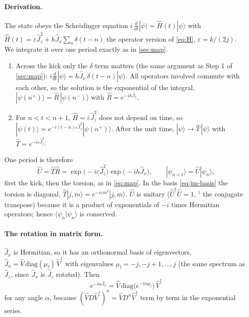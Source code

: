 \documentclass[11pt,a4paper]{article}
\begin{document}
\paragraph{Derivation.} The state obeys the Schrödinger equation $i\,\frac{d}{dt}|\psi\rangle = \hat H(t)|\psi\rangle$
with $\hat H(t) = \varepsilon\hat J_z^2 + h\hat J_x\sum_n\delta(t-n)$ the operator version of \eqref{eq:H}, $\varepsilon = k/(2j)$. We integrate it over one period exactly as in \cref{sec:map}.
\begin{enumerate}
  \item Across the kick only the $\delta$ term matters (the same argument as Step 1 of \cref{sec:map}):
  $i\frac{d}{dt}|\psi\rangle = h\hat J_x\,\delta(t-n)|\psi\rangle$. All operators involved commute
  with each other, so the solution is the exponential of the integral,
  $|\psi(n^+)\rangle = \hat R\,|\psi(n^-)\rangle$ with $\hat R = e^{-ih\hat J_x}$.
  \item For $n < t < n+1$, $\hat H = \varepsilon\hat J_z^2$ does not depend on time, so $|\psi(t)\rangle =
  e^{-i(t-n)\varepsilon\hat J_z^2}|\psi(n^+)\rangle$. After the unit time, $|\psi\rangle \to \hat T\,|\psi\rangle$
  with $\hat T = e^{-i\varepsilon\hat J_z^2}$.
\end{enumerate}
One period is therefore
\begin{equation}\label{eq:floquet}
  \boxed{\hat U = \hat T\hat R = \exp\!\big(-i\varepsilon\hat J_z^2\big)\exp\!\big(-ih\hat J_x\big), \qquad
  |\psi_{n+1}\rangle = \hat U|\psi_n\rangle ,}
\end{equation}
first the kick, then the torsion, as in \eqref{eq:map}. In the basis \eqref{eq:jm-basis} the torsion is diagonal,
$\hat T|j,m\rangle = e^{-i\varepsilon m^2}|j,m\rangle$. $\hat U$ is unitary ($\hat U^\dagger\hat U = 1$, $^\dagger$ the conjugate
transpose) because it is a product of exponentials of $-i$ times Hermitian operators; hence $\langle\psi_n|\psi_n\rangle$
is conserved.

\paragraph{The rotation in matrix form.} $\hat J_x$ is Hermitian, so it has an orthonormal basis of eigenvectors,
$\hat J_x = \hat V\,\mathrm{diag}(\mu_l)\,\hat V^\dagger$ with eigenvalues $\mu_l = -j, -j+1, \dots, j$ (the same
spectrum as $\hat J_z$, since $\hat J_x$ is $\hat J_z$ rotated). Then
\begin{equation}\label{eq:exp-jx}
  e^{-i\alpha\hat J_x} = \hat V\,\mathrm{diag}\big(e^{-i\alpha\mu_l}\big)\,\hat V^\dagger
\end{equation}
for any angle $\alpha$, because $(\hat V D\hat V^\dagger)^n = \hat V D^n\hat V^\dagger$ term by term in the exponential
series.
\end{document}
